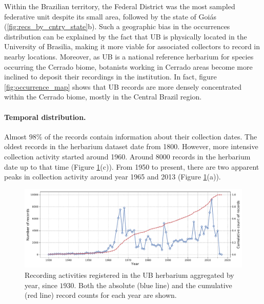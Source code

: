 Within the Brazilian territory, the Federal District was the most sampled federative unit despite its small area, followed by the state of Goiás (\ref{fig:recs_by_cntry_state}b). 
Such a geographic bias in the occurrences distribution can be explained by the fact that UB is physically located in the University of Brasilia, making it more viable for associated collectors to record in nearby locations.
Moreover, as UB is a national reference herbarium for species occurring the Cerrado biome, botanists working in Cerrado areas become more inclined to deposit their recordings in the institution.
In fact, figure \ref{fig:occurrence_map} shows that UB records are more densely concentrated within the Cerrado biome, mostly in the Central Brazil region. 


  
\paragraph*{Temporal distribution.}


Almost $98\%$ of the records contain information about their collection dates.
The oldest records in the herbarium dataset date from 1800.
However, more intensive collection activity started around 1960. Around 8000 records in the herbarium date up to that time (Figure \ref{fig:ub_records_timeseries}(c)). 
From 1950 to present, there are two apparent peaks in collection activity around year 1965 and 2013 (Figure \ref{fig:ub_records_timeseries}(a)). %

  \begin{figure}[h!]
  	\centering
    \includegraphics[width=\linewidth]{figures/casestudy_ub/ub_records_timeseries.pdf}
    \caption{Recording activities registered in the UB herbarium aggregated by year, since $1930$. Both the absolute (blue line) and the cumulative (red line) record counts for each year are shown.}
    \label{fig:ub_records_timeseries}
  \end{figure}









